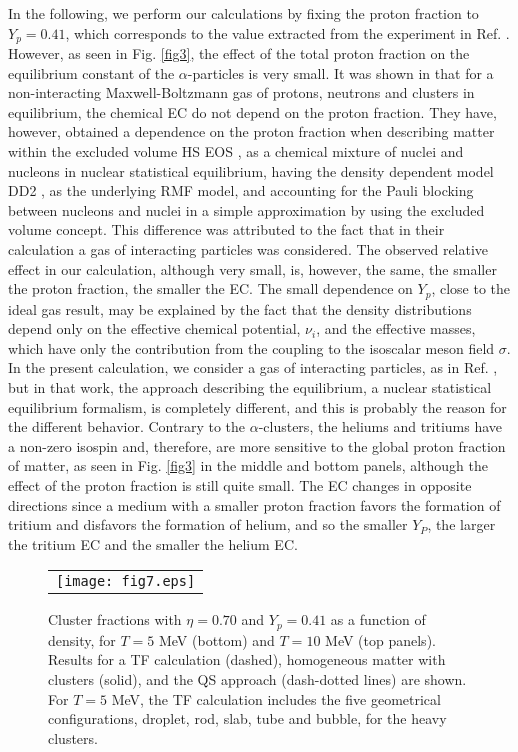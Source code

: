\documentclass[aps,prc,nofootinbib,twocolumn,showpacs]{revtex4-1}
\begin{document}
In the following, we perform our calculations by fixing the proton
fraction to $Y_p=0.41$, which corresponds to the value extracted from the
experiment in Ref. \cite{qin12}.
However, as seen in  Fig. \ref{fig3}, the effect of
the total proton fraction on the equilibrium constant of the $\alpha$-particles is very small. It was shown in
\cite{hempel2015} that for a  non-interacting
Maxwell-Boltzmann gas  of protons, neutrons and
clusters in equilibrium, the  chemical EC do not
depend on the proton fraction. They have, however, obtained a
dependence on the proton fraction when describing matter within the 
excluded volume HS EOS \cite{HSB}, as a chemical mixture of nuclei and nucleons in
nuclear statistical equilibrium,  having the density dependent model DD2 \cite{typel10}, 
as the underlying RMF model, and accounting for the Pauli blocking 
between nucleons and nuclei in a simple approximation by using the excluded volume concept. 
 This difference was attributed to the fact
that in their calculation a gas of  interacting particles was
considered. 
The observed  relative effect in our calculation, although very small,
is, however, the same, the smaller the proton
fraction, the smaller the EC. The small dependence
on $Y_p$, close to the ideal gas result, may be
explained by the fact that the density distributions depend only on the
effective chemical potential, $\nu_i$, and the effective masses, which have
only the contribution  from the coupling to the isoscalar meson field $\sigma$.  
In the present calculation, we consider a gas of interacting
particles, as in Ref. \cite{hempel2015}, but in that work, the approach
describing the equilibrium, a nuclear statistical equilibrium formalism, is completely different, and this is
probably the reason for the different behavior.
 Contrary to the $\alpha$-clusters, the heliums and tritiums have a
non-zero isospin and, therefore, are more sensitive to the global proton
fraction of matter, as seen in Fig. \ref{fig3} in the middle and bottom
panels, although the effect of the proton fraction is still quite small. The EC changes in opposite directions since a medium with a
smaller proton fraction favors the formation of tritium and disfavors
the formation of helium, and so the  smaller $Y_P$, the larger the
tritium EC and the smaller the helium EC.




\begin{figure}[!htbp]
	\begin{tabular}{c}
     \texttt{[image: fig7.eps]}\\
    \end{tabular}
    \caption{Cluster fractions with
     $\eta=0.70$ and $Y_p=0.41$ as a function of density, 
     for $T=5$ MeV (bottom) and $T=10$ MeV (top panels). Results for a
     TF calculation (dashed), homogeneous matter with  clusters
     (solid), and the QS approach (dash-dotted lines) are shown.
       For $T=5$ MeV, the TF calculation includes the
    five geometrical configurations, droplet, rod, slab, tube and
    bubble,  for the heavy clusters. }
\label{fig7}
\end{figure}
\end{document}
